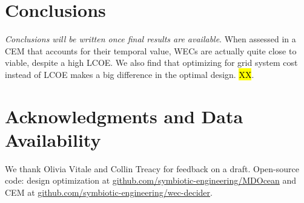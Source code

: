 \documentclass[10pt,twoside]{article}
\begin{document}
\section{Conclusions}
\textit{Conclusions will be written once final results are available}.
When assessed in a CEM that accounts for their temporal value, WECs are actually quite close to viable, despite a high LCOE.
We also find that optimizing for grid system cost instead of LCOE makes a big difference in the optimal design.
\hl{XX}. 

\section*{Acknowledgments and Data Availability}
We thank Olivia Vitale and Collin Treacy for feedback on a draft. Open-source code: design optimization at \url{github.com/symbiotic-engineering/MDOcean} and CEM at \url{github.com/symbiotic-engineering/wec-decider}.

\clearpage




\end{document}
